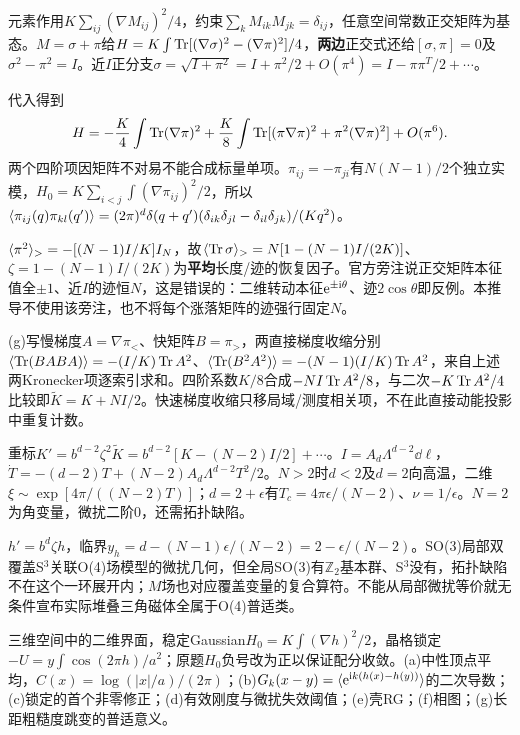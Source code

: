 \begin{solution}
元素作用$K\sum_{ij}(\nabla M_{ij})^2/4$，约束$\sum_kM_{ik}M_{jk}=\delta_{ij}$，任意空间常数正交矩阵为基态。$M=\sigma+\pi$给$H=K\int\operatorname{Tr}[(\nabla\sigma)^2-(\nabla\pi)^2]/4$，\textbf{两边}正交式还给$[\sigma,\pi]=0$及$\sigma^2-\pi^2=I$。近$I$正分支$\sigma=\sqrt{I+\pi^2}=I+\pi^2/2+O(\pi^4)=I-\pi\pi^T/2+\cdots$。

代入得到
\begin{equation}
H=-\frac K4\int\operatorname{Tr}(\nabla\pi)^2+\frac K8\int\operatorname{Tr}[(\pi\nabla\pi)^2+\pi^2(\nabla\pi)^2]+O(\pi^6).
\end{equation}
两个四阶项因矩阵不对易不能合成标量单项。$\pi_{ij}=-\pi_{ji}$有$N(N-1)/2$个独立实模，$H_0=K\sum_{i<j}\int(\nabla\pi_{ij})^2/2$，所以$\langle \pi_{ij}(q)\pi_{kl}(q')\rangle=(2\pi)^d\delta(q+q')(\delta_{ik}\delta_{jl}-\delta_{il}\delta_{jk})/(Kq^2)$。

$\langle \pi^2\rangle_>=-[(N-1)I/K]I_N$，故$\langle \operatorname{Tr}\sigma\rangle_>=N[1-(N-1)I/(2K)]$、$\zeta=1-(N-1)I/(2K)$为\textbf{平均}长度/迹的恢复因子。官方旁注说正交矩阵本征值全$\pm1$、近$I$的迹恒$N$，这是错误的：二维转动本征$\mathrm e^{\pm\mathrm i\theta}$、迹$2\cos\theta$即反例。本推导不使用该旁注，也不将每个涨落矩阵的迹强行固定$N$。

(g)写慢梯度$A=\nabla\pi_<$、快矩阵$B=\pi_>$，两直接梯度收缩分别$\langle \operatorname{Tr}(BABA)\rangle=-(I/K)\operatorname{Tr} A^2$、$\langle \operatorname{Tr}(B^2A^2)\rangle=-(N-1)(I/K)\operatorname{Tr} A^2$，来自上述两Kronecker项逐索引求和。四阶系数$K/8$合成$-NI\operatorname{Tr} A^2/8$，与二次$-K\operatorname{Tr} A^2/4$比较即$\widetilde K=K+NI/2$。快速梯度收缩只移局域/测度相关项，不在此直接动能投影中重复计数。

重标$K'=b^{d-2}\zeta^2\widetilde K=b^{d-2}[K-(N-2)I/2]+\cdots$。$I=A_d\Lambda^{d-2}\dd\ell$，$\dot T=-(d-2)T+(N-2)A_d\Lambda^{d-2}T^2/2$。$N>2$时$d<2$及$d=2$向高温，二维$\xi\sim\exp[4\pi/((N-2)T)]$；$d=2+\epsilon$有$T_c=4\pi\epsilon/(N-2)$、$\nu=1/\epsilon$。$N=2$为角变量，微扰二阶0，还需拓扑缺陷。

$h'=b^d\zeta h$，临界$y_h=d-(N-1)\epsilon/(N-2)=2-\epsilon/(N-2)$。SO(3)局部双覆盖S$^3$关联O(4)场模型的微扰几何，但全局SO(3)有$\mathbb Z_2$基本群、S$^3$没有，拓扑缺陷不在这个一环展开内；$M$场也对应覆盖变量的复合算符。不能从局部微扰等价就无条件宣布实际堆叠三角磁体全属于O(4)普适类。
\end{solution}
\begin{exercise}[原题11(a)--(g)]\label{r:334-3-11}
三维空间中的二维界面，稳定Gaussian$H_0=K\int(\nabla h)^2/2$，晶格锁定$-U=y\int\cos(2\pi h)/a^2$；原题$H_0$负号改为正以保证配分收敛。(a)中性顶点平均，$C(x)=\log(|x|/a)/(2\pi)$；(b)$G_k(x-y)=\langle \mathrm e^{\mathrm i k(h(x)-h(y))}\rangle$的二次导数；(c)锁定的首个非零修正；(d)有效刚度与微扰失效阈值；(e)壳RG；(f)相图；(g)长距粗糙度跳变的普适意义。
\end{exercise}
